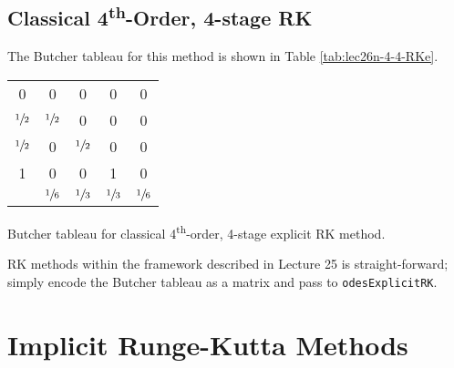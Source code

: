 \subsection{Classical 4\textsuperscript{th}-Order, 4-stage RK}
The Butcher tableau for this method is shown in Table \ref{tab:lec26n-4-4-RKe}.
\begin{margintable}
\begin{tabular}{c|cccc}
0 & 0 & 0 & 0 & 0 \\
$\sfrac{1}{2}$ & $\sfrac{1}{2}$ & 0 & 0 & 0 \\
$\sfrac{1}{2}$ & 0 & $\sfrac{1}{2}$ & 0 & 0 \\
1 & 0 & 0 & 1 & 0 \\ \hline
  & $\sfrac{1}{6}$ & $\sfrac{1}{3}$ & $\sfrac{1}{3}$ & $\sfrac{1}{6}$
\end{tabular}
\caption{Butcher tableau for classical 4\textsuperscript{th}-order, 4-stage explicit RK method.}
\label{tab:lec26n-4-4-RKe}
\end{margintable} 

 RK methods within the framework described in Lecture 25 is straight-forward; simply encode the Butcher tableau as a matrix and pass to \lstinline[style=myMatlab]{odesExplicitRK}.
\section{Implicit Runge-Kutta Methods}
